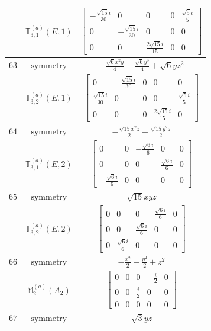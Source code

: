 \documentclass[fleqn,8pt,landscape]{jsarticle}
\begin{document}
\begin{longtable}{ccc}
$  $ & $ \mathbb{T}_{3,1}^{(a)}(E,1) $ & $ \begin{bmatrix} - \frac{\sqrt{15} i}{30} & 0 & 0 & 0 & \frac{\sqrt{5} i}{5} \\ 0 & - \frac{\sqrt{15} i}{30} & 0 & 0 & 0 \\ 0 & 0 & \frac{2 \sqrt{15} i}{15} & 0 & 0 \end{bmatrix} $ \\ \hline
$ 63 $ & $ \text{symmetry} $ & $ - \frac{\sqrt{6} x^{2} y}{4} - \frac{\sqrt{6} y^{3}}{4} + \sqrt{6} y z^{2} $ \\
$  $ & $ \mathbb{T}_{3,2}^{(a)}(E,1) $ & $ \begin{bmatrix} 0 & - \frac{\sqrt{15} i}{30} & 0 & 0 & 0 \\ \frac{\sqrt{15} i}{30} & 0 & 0 & 0 & \frac{\sqrt{5} i}{5} \\ 0 & 0 & 0 & \frac{2 \sqrt{15} i}{15} & 0 \end{bmatrix} $ \\ \hline
$ 64 $ & $ \text{symmetry} $ & $ - \frac{\sqrt{15} x^{2} z}{2} + \frac{\sqrt{15} y^{2} z}{2} $ \\
$  $ & $ \mathbb{T}_{3,1}^{(a)}(E,2) $ & $ \begin{bmatrix} 0 & 0 & - \frac{\sqrt{6} i}{6} & 0 & 0 \\ 0 & 0 & 0 & \frac{\sqrt{6} i}{6} & 0 \\ - \frac{\sqrt{6} i}{6} & 0 & 0 & 0 & 0 \end{bmatrix} $ \\ \hline
$ 65 $ & $ \text{symmetry} $ & $ \sqrt{15} x y z $ \\
$  $ & $ \mathbb{T}_{3,2}^{(a)}(E,2) $ & $ \begin{bmatrix} 0 & 0 & 0 & \frac{\sqrt{6} i}{6} & 0 \\ 0 & 0 & \frac{\sqrt{6} i}{6} & 0 & 0 \\ 0 & \frac{\sqrt{6} i}{6} & 0 & 0 & 0 \end{bmatrix} $ \\ \hline
$ 66 $ & $ \text{symmetry} $ & $ - \frac{x^{2}}{2} - \frac{y^{2}}{2} + z^{2} $ \\
$  $ & $ \mathbb{M}_{2}^{(a)}(A_{2}) $ & $ \begin{bmatrix} 0 & 0 & 0 & - \frac{i}{2} & 0 \\ 0 & 0 & \frac{i}{2} & 0 & 0 \\ 0 & 0 & 0 & 0 & 0 \end{bmatrix} $ \\ \hline
$ 67 $ & $ \text{symmetry} $ & $ \sqrt{3} y z $ \\

\end{longtable}
\end{document}

